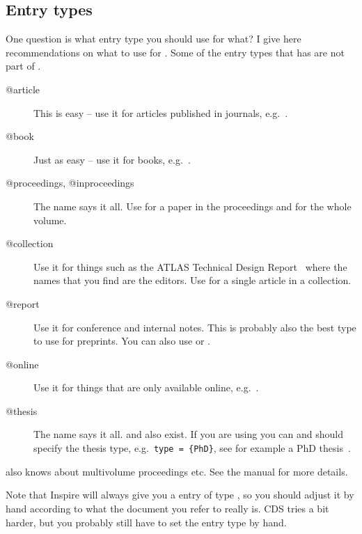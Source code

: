 \subsection{Entry types}
\label{sec:ref:entry}

One question is what entry type you should use for what? I give here
recommendations on what to use for . Some of the entry
types that  has are not part of \BibTeX.

\begin{description}
\item[@article] This is easy -- use it for articles published in
  journals, e.g.~\cite{Abramowicz:2010ih}.
\item[@book] Just as easy -- use it for books, e.g.~\cite{kopka04}.
\item[@proceedings, @inproceedings] The name says it all. Use
   for a paper in the proceedings and
   for the whole volume.
\item[@collection] Use it for things such as the ATLAS Technical Design
  Report~\cite{lhc:vol1} where the names that you find are the
  editors. Use  for a single article in a
  collection.
\item[@report] Use it for conference and
  internal notes. This is
  probably also the best type to use for preprints. You can also use
   or .
\item[@online] Use it for things that are only available online,
  e.g.~\cite{lshort}.
\item[@thesis] The name says it all.
    and
  also exist. If you are using  you can and should specify
  the thesis type, e.g.\ \texttt{type = \{PhD\}}, see for example a
  PhD thesis~\cite{tlodd:2012}.
\end{description}

 also knows about multivolume proceedings etc. See
the manual for more details.

Note that Inspire will always give you a \BibTeX{} entry of type
, so you should adjust it by hand according to what
the document you refer to really is. CDS tries a bit harder, but you
probably still have to set the entry type by hand.

